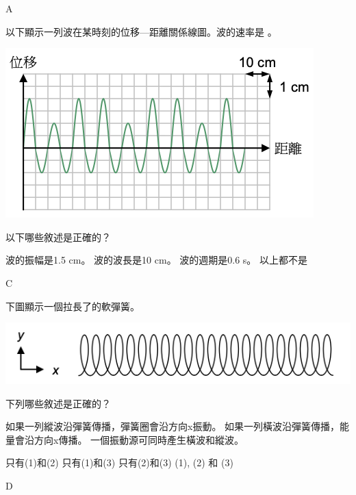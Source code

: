 {\begin{tasks}
        \task {}
    \end{tasks}

}{A}

{
    以下顯示一列波在某時刻的位移—距離關係線圖。波的速率是 。
    \par{\par\centering\includegraphics[width=.35\textwidth]{./img/ch1_earlyclass_wave_mc_2024-05-13-16-01-07.png}\par}
    以下哪些敘述是正確的？
    \begin{tasks}
        \task 波的振幅是1.5 cm。
        \task 波的波長是10 cm。
        \task 波的週期是0.6 s。
        \task 以上都不是
    \end{tasks}

}{C}

{
    下圖顯示一個拉長了的軟彈簧。
    \par{\par\centering\includegraphics[width=.4\textwidth]{./img/ch1_earlyclass_wave_mc_2024-05-13-16-02-17.png}\par}
    下列哪些敘述是正確的？
    \begin{statements}
        \task 如果一列縱波沿彈簧傳播，彈簧圈會沿方向x振動。
        \task 如果一列橫波沿彈簧傳播，能量會沿方向x傳播。
        \task 一個振動源可同時產生橫波和縱波。
    \end{statements}
    \begin{tasks}
        \task 只有(1)和(2)
        \task 只有(1)和(3)
        \task 只有(2)和(3)
        \task (1), (2) 和 (3)
    \end{tasks}

}{D}

